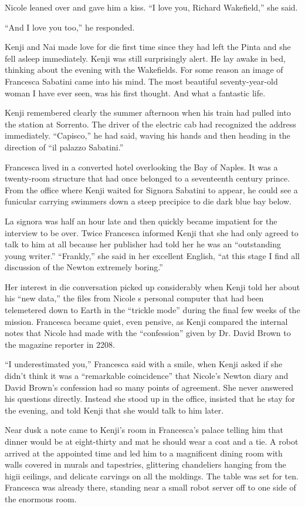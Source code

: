 \documentclass[]{article}
\begin{document}
{Nicole leaned over and gave him a kiss. “I love you, Richard Wakefield,” she said.

“And I love you too,” he responded.

Kenji and Nai made love for die first time since they had left the Pinta and she fell asleep immediately. Kenji was still surprisingly alert. He lay awake in bed, thinking about the evening with the Wakefields. For some reason an image of Francesca Sabatini came into his mind. The most beautiful seventy-year-old woman I have ever seen, was his first thought. And what a fantastic life.

Kenji remembered clearly the summer afternoon when his train had pulled into the station at Sorrento. The driver of the electric cab had recognized the address immediately. “Capisco,” he had said, waving his hands and then heading in the direction of “il palazzo Sabatini.”

Francesca lived in a converted hotel overlooking the Bay of Naples. It was a twenty-room structure that had once belonged to a seventeenth century prince. From the office where Kenji waited for Signora Sabatini to appear, he could see a funicular carrying swimmers down a steep precipice to die dark blue bay below.

La signora was half an hour late and then quickly became impatient for the interview to be over. Twice Francesca informed Kenji that she had only agreed to talk to him at all because her publisher had told her he was an “outstanding young writer.” “Frankly,” she said in her excellent English, “at this stage I find all discussion of the Newton extremely boring.”

Her interest in die conversation picked up considerably when Kenji told her about his “new data,” the files from Nicole s personal computer that had been telemetered down to Earth in the “trickle mode” during the final few weeks of the mission. Francesca became quiet, even pensive, as Kenji compared the internal notes that Nicole had made with the “confession” given by Dr. David Brown to the magazine reporter in 2208.

“I underestimated you,” Francesca said with a smile, when Kenji asked if she didn’t think it was a “remarkable coincidence” that Nicole’s Newton diary and David Brown’s confession had so many points of agreement. She never answered his questions directly. Instead she stood up in the office, insisted that he stay for the evening, and told Kenji that she would talk to him later.

Near dusk a note came to Kenji’s room in Francesca’s palace telling him that dinner would be at eight-thirty and mat he should wear a coat and a tie. A robot arrived at the appointed time and led him to a magnificent dining room with walls covered in murals and tapestries, glittering chandeliers hanging from the higii ceilings, and delicate carvings on all the moldings. The table was set for ten. Francesca was already there, standing near a small robot server off to one side of the enormous room.

}
\end{document}
